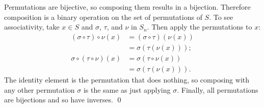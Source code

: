 \documentclass[../UNABRIDGEDalgebraNotesMSRI-UP2016.tex]{subfiles}
\begin{document}
\begin{frame}
Permutations are bijective, so composing them results in a bijection.  Therefore composition is a binary operation on the set of permutations of $S$.  To see associativity, take $x\in S$ and $\sigma$, $\tau$, and $\nu$ in $S_n$.  Then apply the permutations to $x$:
\begin{align*}
(\sigma\circ\tau)\circ \nu(x) &= (\sigma\circ\tau)\left(\nu(x)\right) \\
 &= \sigma\left(\tau\left(\nu(x)\right)\right); \\
\sigma\circ(\tau\circ\nu)(x) &= \sigma\left(\tau\circ\nu(x)\right) \\
 &= \sigma\left(\tau\left(\nu(x)\right)\right).  
\end{align*}
The identity element is the permutation that does nothing, so composing with any other permutation $\sigma$ is the same as just applying $\sigma$.  Finally, all permutations are bijections and so have inverses.
\qed
\end{frame}
\end{document}
